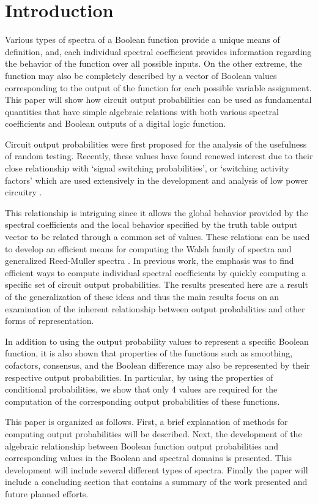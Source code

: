 \section{Introduction}
Various types of spectra of a Boolean function provide a unique 
means of definition, and,
each individual spectral coefficient provides information
regarding the behavior of the function over all possible inputs.
On the other extreme, the function may also be completely
described by a vector of Boolean values corresponding to the
output of the function for each possible variable assignment.
This paper will 
show how circuit output probabilities can be used as fundamental
quantities that have simple algebraic relations with both various
spectral coefficients and Boolean outputs of a digital logic function.

Circuit output probabilities \cite{PM75} were first proposed
for the analysis of the usefulness of random testing.  Recently,
these values 
have found renewed interest due to their close relationship with
`signal switching probabilities', or `switching activity factors'
which are used extensively in the development and analysis of
low power circuitry \cite{GDKW92}  \cite{MP96} \cite{TPD93}.  

This relationship is intriguing since it allows the global behavior
provided by the spectral coefficients and the local behavior 
specified by the truth table output vector to be related through a common
set of values. 
These relations can be used to develop 
an efficient means for computing the
Walsh family of spectra \cite{TN94e} and generalized Reed-Muller
spectra \cite{TN95a}.  In previous work, the emphasis was
to find efficient ways to compute individual spectral coefficients
by quickly computing a specific set of circuit output probabilities.
The results presented here are a result of the generalization of these ideas
and thus the main results focus on
an examination of the inherent relationship between
output probabilities and other forms of representation.

In addition to using the output probability values to represent a 
specific Boolean function, it is also shown that properties of the
functions such as smoothing, cofactors, consensus, and the Boolean
difference may also be represented by their respective output
probabilities.  In particular, by using the properties of conditional
probabilities, we show that only 4 values are required for 
the computation of the corresponding output probabilities of these 
functions.

This paper is organized as follows.  First, a brief explanation of methods 
for computing output probabilities will be described.
Next, 
the development of the algebraic relationship between 
Boolean function output probabilities and corresponding values in the
Boolean and spectral domains is presented.  This development will include several different
types of spectra.  
Finally the paper will include a concluding
section that contains a summary of the work presented and future
planned efforts.
